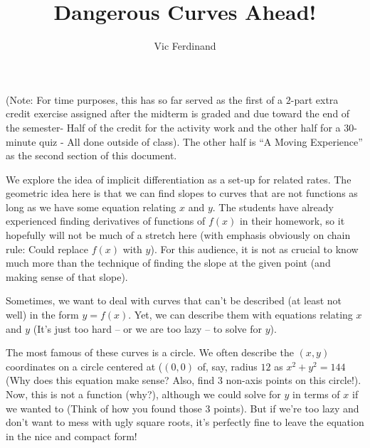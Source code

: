 \documentclass[handout]{ximera}
\author{Vic Ferdinand}
\title{Dangerous Curves Ahead!}
\begin{document}
\begin{abstract}
\end{abstract}
\maketitle

\begin{instructorIntro}

(Note: For time purposes, this has so far served as the first of a $2$-part extra credit exercise assigned after the midterm is graded and due toward the end of the semester- Half of the credit for the activity work and the other half for a $30$-minute quiz - All done outside of class).  The other half is ``A Moving Experience'' as the second section of this document.


We explore the idea of implicit differentiation as a set-up for related rates.  The geometric idea here is that we can find slopes to curves that are not functions as long as we have some equation relating $x$ and $y$.  The students have already experienced finding derivatives of functions of $f(x)$ in their homework, so it hopefully will not be much of a stretch here (with emphasis obviously on chain rule:  Could replace $f(x)$ with $y$).  For this audience, it is not as crucial to know much more than the technique of finding the slope at the given point (and making sense of that slope).
\end{instructorIntro}



Sometimes, we want to deal with curves that can't be described (at least not well) in the form  $y=f(x)$.  Yet, we can describe them with equations relating $x$ and $y$ (It's just too hard – or we are too lazy – to solve for $y$).

 The most famous of these curves is a circle.  We often describe the $(x, y)$ coordinates on a circle centered at ($(0, 0)$ of, say, radius $12$ as $x^2+y^2=144$ (Why does this equation make sense?  Also, find $3$ non-axis points on this circle!).  Now, this is not a function (why?), although we could solve for $y$ in terms of $x$ if we wanted to (Think of how you found those $3$ points).  But if we're too lazy and don't want to mess with ugly square roots, it's perfectly fine to leave the equation in the nice and compact  form!
 
\end{document}

